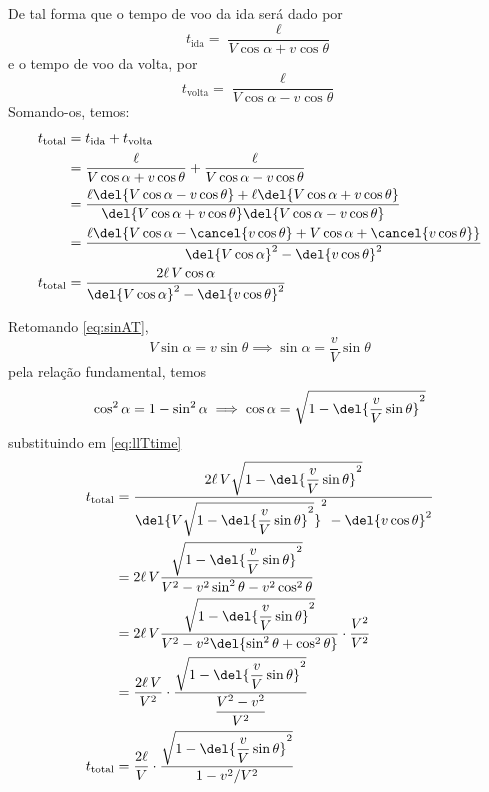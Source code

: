 \documentclass[]{IMTexam}
\begin{document}
\begin{questions}
\begin{parts}
\begin{solution}
			De tal forma que o tempo de voo da ida será dado por
			\[ t_{\text{ida}}=\dfrac{\ell}{V\cos\alpha+v\cos\theta} \]
			e o tempo de voo da volta, por
			\[ t_{\text{volta}}=\dfrac{\ell}{V\cos\alpha-v\cos\theta} \]
			Somando-os, temos:
			\begin{align}
				t_{\text{total}} & =t_{\text{ida}}+t_{\text{volta}}\nonumber                                                                                                         \\
				                 & =\dfrac{\ell}{V\cos\alpha+v\cos\theta}+\dfrac{\ell}{V\cos\alpha-v\cos\theta}\nonumber                                                             \\
				                 & =\dfrac{\ell\del{V\cos\alpha-v\cos\theta}+\ell\del{V\cos\alpha+v\cos\theta}}{\del{V\cos\alpha+v\cos\theta}\del{V\cos\alpha-v\cos\theta}}\nonumber \\
				                 & =\dfrac{\ell\del{V\cos\alpha-\cancel{v\cos\theta}+V\cos\alpha+\cancel{v\cos\theta}}}{\del{V\cos\alpha}^{2}-\del{v\cos\theta}^{2}}\nonumber        \\
				t_{\text{total}} & =\dfrac{2\ell\,V\cos\alpha}{\del{V\cos\alpha}^{2}-\del{v\cos\theta}^{2}}\label{eq:llTtime}
			\end{align}

			Retomando \ref{eq:sinAT},
			\begin{equation}\label{eq:sinAsinT}
				V\sin\alpha=v\sin\theta\implies \sin\alpha=\dfrac{v}{V}\sin\theta
			\end{equation}
			pela relação fundamental, temos
			\[ \cos^{2}\alpha=1-\sin^{2}\alpha\implies\cos\alpha=\sqrt{1-\del{\dfrac{v}{V}\sin\theta}^{2}} \]
			substituindo em \ref{eq:llTtime}
			\begin{align}
				t_{\text{total}} & =\dfrac{2\ell\,V\sqrt{1-\del{\dfrac{v}{V}\sin\theta}^{2}}}{\del{V\sqrt{1-\del{\dfrac{v}{V}\sin\theta}^{2}}}^{2}-\del{v\cos\theta}^{2}}\nonumber \\
				                 & =2\ell\,V\dfrac{\sqrt{1-\del{\dfrac{v}{V}\sin\theta}^{2}}}{V^{2}-v^{2}\sin^{2}\theta-v^{2}\cos^{2}\theta}\nonumber                              \\
				                 & =2\ell\,V\dfrac{\sqrt{1-\del{\dfrac{v}{V}\sin\theta}^{2}}}{V^{2}-v^{2}\del{\sin^{2}\theta+\cos^{2}\theta}}\cdot \dfrac{V^{2}}{V^{2}} \nonumber  \\
				                 & =\dfrac{2\ell\,V}{V^{2}}\cdot\dfrac{\sqrt{1-\del{\dfrac{v}{V}\sin\theta}^{2}}}{\dfrac{V^{2}-v^{2}}{V^{2}}}\nonumber                             \\
				t_{\text{total}} & =\dfrac{2\ell}{V}\cdot\dfrac{\sqrt{1-\del{\dfrac{v}{V}\sin\theta}^{2}}}{1-v^{2}/V^{2}}\label{eq:totalT}
			\end{align}


\end{solution}
\end{parts}
\end{questions}
\end{document}
